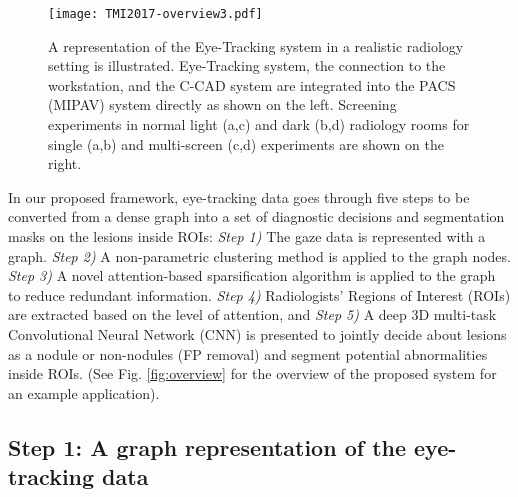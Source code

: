 \documentclass[preprint,12pt]{elsarticle}
\begin{document}
\begin{figure}[h]
% 
% 
% 
% 
\centering\texttt{[image: TMI2017-overview3.pdf]}
\caption{A representation of the Eye-Tracking system in a realistic  radiology setting is illustrated. Eye-Tracking system, the connection to the workstation, and the C-CAD system are integrated into the PACS (MIPAV) system directly as shown on the left. Screening experiments in normal light (a,c) and dark (b,d) radiology rooms for single (a,b) and multi-screen (c,d) experiments are shown on the right.\label{fig:data}}
\end{figure}



In our proposed framework, eye-tracking data goes through five steps to be converted from a dense graph into a set of diagnostic decisions and segmentation masks on the lesions inside ROIs: \textit{Step 1)} The gaze data is represented with a graph. \textit{Step 2)} A non-parametric clustering method is applied to the graph nodes.\textit{ Step 3)} A novel attention-based sparsification algorithm is applied to the graph to reduce redundant information. \textit{Step 4)} Radiologists' Regions of Interest (ROIs) are extracted based on the level of attention, and  \textit{Step 5)} A deep 3D multi-task Convolutional Neural Network (CNN) is presented to jointly decide about lesions as a nodule or non-nodules (FP removal) and segment potential abnormalities inside ROIs. (See Fig. \ref{fig:overview} for the overview of the proposed system for an example application). 



\subsection{Step 1: A graph representation of the eye-tracking data}
\end{document}
